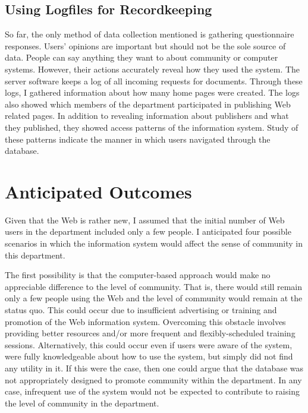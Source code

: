 \subsection{Using Logfiles for Recordkeeping}
So far, the only method of data collection mentioned is gathering questionnaire
responses.  Users' opinions are important but should not be the sole source of
data.  People can say anything they want to about community or computer
systems.  However, their actions accurately reveal how they used the system.
The server software keeps a log of all incoming requests for documents.
Through these logs, I gathered information about how many home pages were
created.  The logs also showed which members of the department participated in
publishing Web related pages.  In addition to revealing information about
publishers and what they published, they showed access patterns of the
information system.  Study of these patterns indicate the manner in which users
navigated through the database.

\section{Anticipated Outcomes}
Given that the Web is rather new, I assumed that the initial number of Web
users in the department included only a few people.  I anticipated four
possible scenarios in which the information system would affect the sense of
community in this department.

The first possibility is that the computer-based approach would make no
appreciable difference to the level of community.  That is, there would still
remain only a few people using the Web and the level of community would remain
at the status quo.  This could occur due to insufficient advertising or
training and promotion of the Web information system.  Overcoming this obstacle
involves providing better resources and/or more frequent and flexibly-scheduled
training sessions.  Alternatively, this could occur even if users were aware of
the system, were fully knowledgeable about how to use the system, but simply
did not find any utility in it.  If this were the case, then one could argue
that the database was not appropriately designed to promote community within
the department.  In any case, infrequent use of the system would not be
expected to contribute to raising the level of community in the department.

